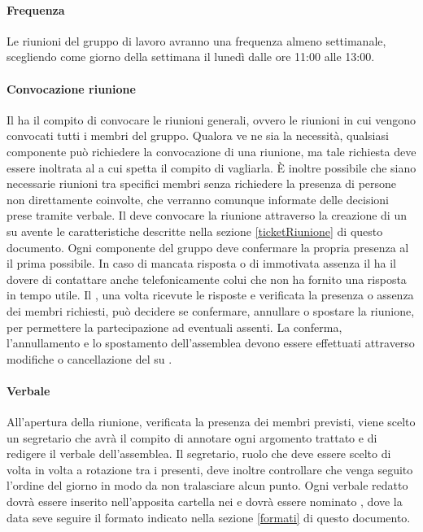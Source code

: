 \documentclass[12pt,a4paper]{article}
\begin{document}
\label{Riunioni}
\paragraph{Frequenza}
Le riunioni del gruppo di lavoro avranno una frequenza almeno settimanale, scegliendo come giorno della settimana il lunedì dalle ore 11:00 alle 13:00.

\paragraph{Convocazione riunione}
Il \PM{} ha il compito di convocare le riunioni generali, ovvero le riunioni in cui vengono convocati tutti i membri del gruppo.
Qualora ve ne sia la necessità, qualsiasi componente può richiedere la convocazione di una riunione, ma tale richiesta deve essere inoltrata al \PM{} a cui spetta il compito di vagliarla. È inoltre possibile che siano necessarie riunioni tra specifici membri senza richiedere la presenza di persone non direttamente coinvolte, che verranno comunque informate delle decisioni prese tramite verbale.
Il \PM{} deve convocare la riunione attraverso la creazione di un  su  avente le caratteristiche descritte nella sezione \ref{ticketRiunione} di questo documento.
Ogni componente del gruppo deve confermare la propria presenza al \PM{} il prima possibile. 
In caso di mancata risposta o di immotivata assenza il \PM{} ha il dovere di contattare anche telefonicamente colui che non ha fornito una risposta in tempo utile. Il \PM{}, una volta ricevute le risposte e verificata la presenza o assenza dei membri richiesti, può decidere se confermare, annullare o spostare la riunione, per permettere la partecipazione ad eventuali assenti. La conferma, l'annullamento e lo spostamento dell'assemblea devono essere effettuati attraverso modifiche o cancellazione del  su .

\paragraph{Verbale}
All'apertura della riunione, verificata la presenza dei membri previsti, viene scelto un segretario che avrà il compito di annotare ogni argomento trattato e di redigere il verbale dell'assemblea.
Il segretario, ruolo che deve essere scelto di volta in volta a rotazione tra i presenti, deve inoltre controllare che venga seguito l'ordine del giorno in modo da non tralasciare alcun punto.
Ogni verbale redatto dovrà essere inserito nell'apposita cartella  nei  e dovrà essere nominato , dove la data seve seguire il formato indicato nella sezione \ref{formati} di questo documento.
\end{document}
